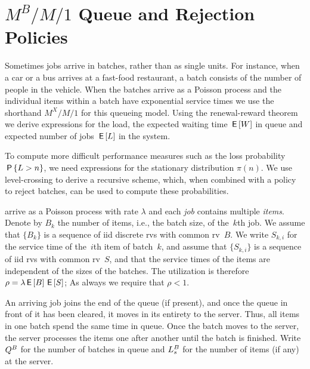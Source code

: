 \documentclass[stochastic-or.tex]{subfiles}
\begin{document}
\section{\texorpdfstring{$M^B/M/1$}{MBM1pk} Queue and Rejection Policies}
\label{sec:mxm1-queue:-expected}

Sometimes jobs arrive in batches, rather than as single units.
For instance, when a car or a bus arrives at a fast-food restaurant, a batch consists of the number of people in the vehicle.
When the batches arrive as a Poisson process and the individual items within a batch have exponential service times we use the shorthand $M^X/M/1$ for this queueing model.
Using the renewal-reward theorem we derive expressions for the load, the expected waiting time  $\,\mathsf{E}\left[W\right]$ in queue and expected number of jobs $\,\mathsf{E}\left[L\right]$ in the system.

To compute more difficult performance measures such as the loss probability $\,\mathsf{P}\left\{L>n\right\}$, we need expressions for the stationary distribution $\pi(n)$.
We use level-crossing to derive a recursive scheme, which, when combined with a policy to reject batches, can be used to compute these probabilities.


 arrive as a Poisson process with rate $\lambda$ and each \emph{job} contains multiple \emph{items}.
Denote by $B_k$ the number of items, i.e., the batch size, of the~$k$th job.
We assume that $\{B_k\}$ is a sequence of iid discrete rvs with common rv~$B$.
We write $S_{k,i}$ for the service time of the~$i$th item of batch~$k$, and assume that $\{S_{k, i}\}$ is a sequence of iid rvs with common rv~$S$, and that the service times of the items are independent of the sizes of the batches.
The utilization is therefore
$\rho = \lambda \,\mathsf{E}\left[B\right] \,\mathsf{E}\left[S\right]$;
As always we require that $\rho<1$.


An arriving job joins the end of the queue (if present), and once the queue in front of it has been cleared, it moves in its entirety to the server.
Thus, all items in one batch spend the same time in queue.
Once the batch moves to the server, the server processes the items one after another until the batch is finished.
Write $Q^B$ for the number of batches in queue and $L_s^B$ for the number of items (if any) at the server.
\end{document}
